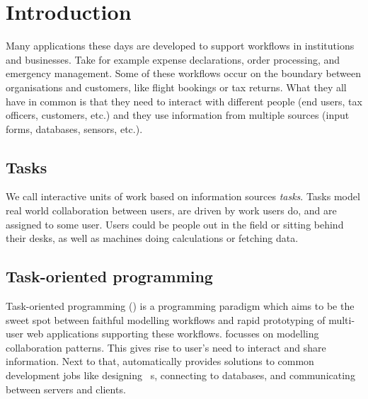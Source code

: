 


\section{Introduction}


Many applications these days are developed to support workflows in institutions and businesses.
Take for example expense declarations, order processing, and emergency management.
Some of these workflows occur on the boundary between organisations and customers,
like flight bookings or tax returns.
What they all have in common is
that they need to interact with different people (end users, tax officers, customers, etc.)
and they use information from multiple sources (input forms, databases, sensors, etc.).

\subsection{Tasks}

We call interactive units of work based on information sources \emph{tasks}.
Tasks model real world collaboration between users,
are driven by work users do,
and are assigned to some user.
Users could be people out in the field or sitting behind their desks,
as well as machines doing calculations or fetching data.



\subsection{Task-oriented programming}
Task-oriented programming (\TOP) is a programming paradigm which aims to be the sweet spot between faithful modelling workflows
and rapid prototyping of multi-user web applications supporting these workflows.
\TOP focusses on modelling collaboration patterns.
This gives rise to user's need to interact and share information.
Next to that, \TOP automatically provides solutions to common development jobs like designing \GUI\ s, connecting to databases, and communicating between servers and clients.

